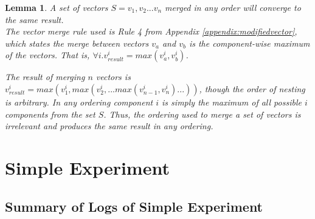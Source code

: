 \documentclass[12pt,a4paper,twoside,openright]{report}
\newtheorem{lemma}{Lemma}
\begin{document}
	\begin{lemma}\label{VectorMergeLemma}
		A set of vectors $S = {v_1, v_2... v_n}$ merged in any order will converge to the same result.\\
		The vector merge rule used is Rule 4 from Appendix \ref{appendix:modifiedvector}, which states the merge between vectors $v_a$ and $v_b$ is the component-wise maximum of the vectors. That is, $\forall i. v_{result}^i = max(v_a^i, v_b^i)$.
		
		The result of merging $n$ vectors is $v_{result}^i = max(v_1^i, max(v_2^i,...max(v_{n-1}^i, v_n^i)...))$, though the order of nesting is arbitrary. In any ordering component $i$ is simply the maximum of all possible $i$ components from the set $S$. Thus, the ordering used to merge a set of vectors is irrelevant and produces the same result in any ordering.
		
	\end{lemma}

\chapter{Simple Experiment}

\section{Summary of Logs of Simple Experiment}
\label{appendix:simplelogsummary}
\end{document}
